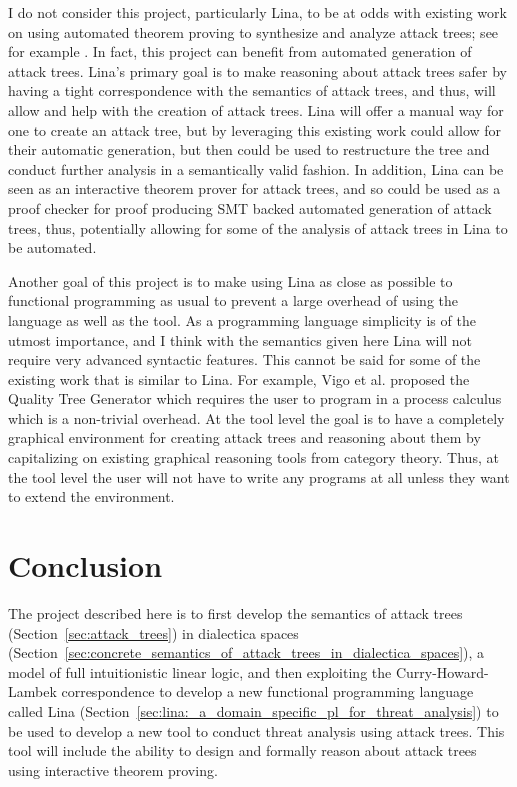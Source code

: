 \documentclass{sigplanconf}
\begin{document}
I do not consider this project, particularly Lina, to be at odds with
existing work on using automated theorem proving to synthesize and
analyze attack trees; see for example
\cite{essay69399,Sheyner:2002:AGA:829514.830526,6957121,essay69402}.
In fact, this project can benefit from automated generation of attack
trees.  Lina's primary goal is to make reasoning about attack trees
safer by having a tight correspondence with the semantics of attack
trees, and thus, will allow and help with the creation of attack
trees.  Lina will offer a manual way for one to create an attack tree,
but by leveraging this existing work could allow for their automatic
generation, but then could be used to restructure the tree and conduct
further analysis in a semantically valid fashion.  In addition, Lina
can be seen as an interactive theorem prover for attack trees, and so
could be used as a proof checker \cite{Stump:2012} for proof producing
SMT backed automated generation of attack trees, thus, potentially
allowing for some of the analysis of attack trees in Lina to be
automated.

Another goal of this project is to make using Lina as close as
possible to functional programming as usual to prevent a large
overhead of using the language as well as the tool.  As a programming
language simplicity is of the utmost importance, and I think with the
semantics given here Lina will not require very advanced syntactic
features.  This cannot be said for some of the existing work that is
similar to Lina.  For example, Vigo et al. \cite{6957121} proposed the
Quality Tree Generator which requires the user to program in a process
calculus which is a non-trivial overhead. At the tool level the goal
is to have a completely graphical environment for creating attack
trees and reasoning about them by capitalizing on existing graphical
reasoning tools from category theory.  Thus, at the tool level the
user will not have to write any programs at all unless they want to
extend the environment.

\section{Conclusion}
\label{sec:conclusion}

The project described here is to first develop the semantics of attack
trees (Section~\ref{sec:attack_trees}) in dialectica spaces
(Section~\ref{sec:concrete_semantics_of_attack_trees_in_dialectica_spaces}),
a model of full intuitionistic linear logic, and then exploiting the
Curry-Howard-Lambek correspondence to develop a new functional
programming language called Lina
(Section~\ref{sec:lina:_a_domain_specific_pl_for_threat_analysis}) to
be used to develop a new tool to conduct threat analysis using attack
trees.  This tool will include the ability to design and formally
reason about attack trees using interactive theorem proving.
\end{document}
